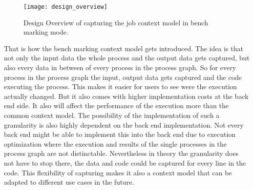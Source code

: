 \documentclass[draft,final]{vutinfth} %
\begin{document}
\begin{figure}[h]
	\centering
	\texttt{[image: design\_overview]}
	\caption{Design Overview of capturing the job context model in bench marking mode.}
	\label{fig:design_overview} %
\end{figure}
That is how the bench marking context model gets introduced. The idea is that not only the input data the whole process and the output data gets captured, but also every data in between of every process in the process graph. So for every process in the process graph the input, output data gets captured and the code executing the process. This makes it easier for users to see were the execution actually changed. But it also comes with higher implementation costs at the back end side. It also will affect the performance of the execution more than the common context model. The possibility of the implementation of such a granularity is also highly dependent on the back end implementation. Not every back end might be able to implement this into the back end due to execution optimization where the execution and results of the single  processes in the process graph are not distinctable. Nevertheless in theory the granularity does not have to stop there, the data and code could be captured for every line in the code. This flexibility of capturing makes it also a context model that  can be adapted to different use cases in the future.  

\backmatter

\listoffigures %

\cleardoublepage %
\listoftables %


\printindex

\printglossaries



\end{document}
